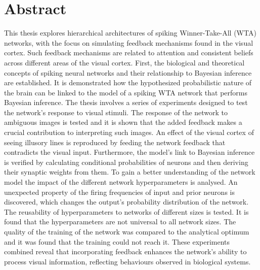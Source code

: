 
\chapter*{Abstract}
\label{cha:abstract}

This thesis explores hierarchical architectures of spiking Winner-Take-All (WTA) networks, with the focus on simulating feedback mechanisms found in the visual cortex. Such feedback mechanisms are related to attention and consistent beliefs across different areas of the visual cortex. 
First, the biological and theoretical concepts of spiking neural networks and their relationship to Bayesian inference are established. It is demonstrated how the hypothesized probabilistic nature of the brain can be linked to the model of a spiking WTA network that performs Bayesian inference.
The thesis involves a series of experiments designed to test the network's response to visual stimuli. The response of the network to ambiguous images is tested and it is shown that the added feedback makes a crucial contribution to interpreting such images. An effect of the visual cortex of seeing illusory lines is reproduced by feeding the network feedback that contradicts the visual input. Furthermore, the model's link to Bayesian inference is verified by calculating conditional probabilities of neurons and then deriving their synaptic weights from them. To gain a better understanding of the network model the impact of the different network hyperparameters is analysed. An unexpected property of the firing frequencies of input and prior neurons is discovered, which changes the output's probability distribution of the network. The reusability of hyperparameters to networks of different sizes is tested. It is found that the hyperparameters are not universal to all network sizes. The quality of the training of the network was compared to the analytical optimum and it was found that the training could not reach it. These experiments combined reveal that incorporating feedback enhances the network's ability to process visual information, reflecting behaviours observed in biological systems.

